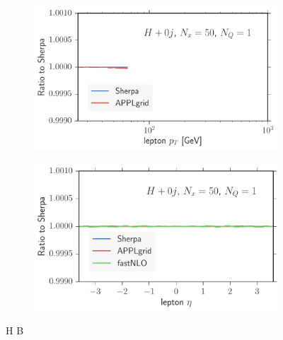 \begin{figure}
\begin{subfigure}[]{0.49\textwidth}
	\includegraphics[width=\textwidth]{images/hb_lpt.pdf}
\end{subfigure}
\begin{subfigure}[]{0.49\textwidth}
	\includegraphics[width=\textwidth]{images/hb_leta.pdf}
\end{subfigure}
\caption{H B}
\end{figure}
%
